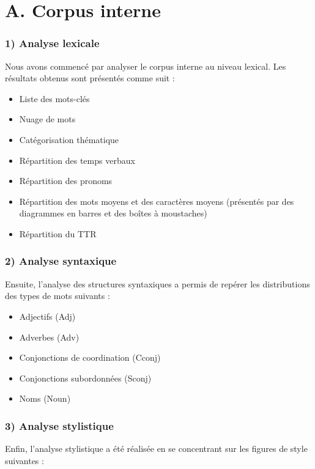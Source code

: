 \section{A. Corpus interne}

\subsubsection{1) Analyse lexicale}

Nous avons commencé par analyser le corpus interne au niveau lexical. Les résultats obtenus sont présentés comme suit :

\begin{itemize}[label=·]
    \item Liste des mots-clés
    \item Nuage de mots
    \item Catégorisation thématique
    \item Répartition des temps verbaux
    \item Répartition des pronoms
    \item Répartition des mots moyens et des caractères moyens (présentés par des diagrammes en barres et des boîtes à moustaches)
    \item Répartition du TTR
\end{itemize}

\subsubsection{2) Analyse syntaxique}

Ensuite, l'analyse des structures syntaxiques a permis de repérer les distributions des types de mots suivants :

\begin{itemize}[label=·]
    \item Adjectifs (Adj)
    \item Adverbes (Adv)
    \item Conjonctions de coordination (Cconj)
    \item Conjonctions subordonnées (Sconj)
    \item Noms (Noun)
\end{itemize}

\subsubsection{3) Analyse stylistique}

Enfin, l'analyse stylistique a été réalisée en se concentrant sur les figures de style suivantes :

